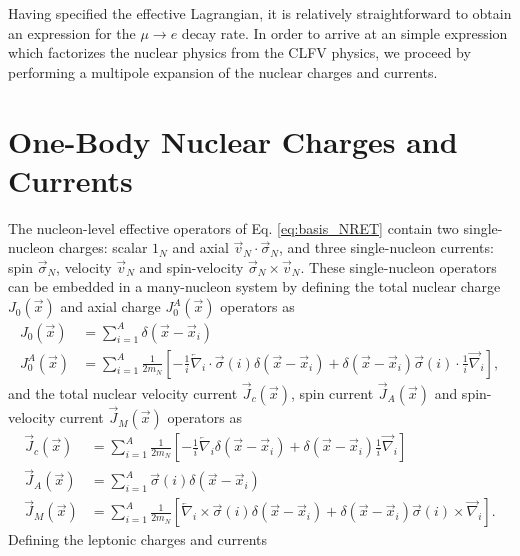 \documentclass{book}[12pt]
\begin{document}
Having specified the effective Lagrangian, it is relatively straightforward to obtain an expression for the $\mu\rightarrow e$ decay rate. In order to arrive at an simple expression which factorizes the nuclear physics from the CLFV physics, we proceed by performing a multipole expansion of the nuclear charges and currents. 
\section{One-Body Nuclear Charges and Currents}
The nucleon-level effective operators of Eq. \ref{eq:basis_NRET} contain two single-nucleon charges: scalar $1_N$ and axial $\vec{v}_N\cdot\vec{\sigma}_N$, and three single-nucleon currents: spin $\vec{\sigma}_N$, velocity $\vec{v}_N$ and spin-velocity $\vec{\sigma}_N\times\vec{v}_N$. These single-nucleon operators can be embedded in a many-nucleon system by defining the total nuclear charge $J_0(\vec{x})$ and axial charge $J_0^A(\vec{x})$ operators as
\begin{equation}
\begin{split}
J_0(\vec{x})&=\sum_{i=1}^A \delta(\vec{x}-\vec{x}_i)\\
J_0^A(\vec{x})&=\sum_{i=1}^A \frac{1}{2m_N}\left[-\frac{1}{i}\overleftarrow{\nabla}_i\cdot\vec{\sigma}(i)\delta(\vec{x}-\vec{x}_i)+\delta(\vec{x}-\vec{x}_i)\vec{\sigma}(i)\cdot\frac{1}{i}\overrightarrow{\nabla}_i\right],
\end{split}
\end{equation}
and the total nuclear velocity current $\vec{J}_c(\vec{x})$, spin current $\vec{J}_A(\vec{x})$ and spin-velocity current $\vec{J}_M(\vec{x})$ operators as
\begin{equation}
\begin{split}
\vec{J}_c(\vec{x})&=\sum_{i=1}^A \frac{1}{2m_N}\left[-\frac{1}{i}\overleftarrow{\nabla}_i\delta(\vec{x}-\vec{x}_i)+\delta(\vec{x}-\vec{x}_i)\frac{1}{i}\overrightarrow{\nabla}_i\right]\\
\vec{J}_A(\vec{x})&=\sum_{i=1}^A\vec{\sigma}(i)\delta(\vec{x}-\vec{x}_i)\\
\vec{J}_M(\vec{x})&=\sum_{i=1}^A \frac{1}{2m_N}\left[\overleftarrow{\nabla}_i\times\vec{\sigma}(i)\delta(\vec{x}-\vec{x}_i)+\delta(\vec{x}-\vec{x}_i)\vec{\sigma}(i)\times\overrightarrow{\nabla}_i\right].
\end{split}
\end{equation}
Defining the leptonic charges and currents
\end{document}
